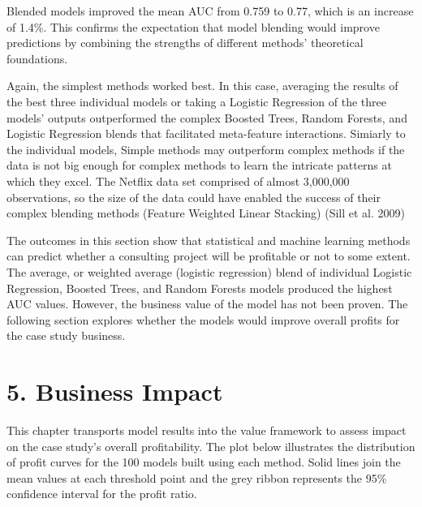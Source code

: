 \documentclass[]{elsarticle} %
\begin{document}
Blended models improved the mean AUC from 0.759 to 0.77, which is an
increase of 1.4\%. This confirms the expectation that model blending
would improve predictions by combining the strengths of different
methods' theoretical foundations.

Again, the simplest methods worked best. In this case, averaging the
results of the best three individual models or taking a Logistic
Regression of the three models' outputs outperformed the complex Boosted
Trees, Random Forests, and Logistic Regression blends that facilitated
meta-feature interactions. Simiarly to the individual models, Simple
methods may outperform complex methods if the data is not big enough for
complex methods to learn the intricate patterns at which they excel. The
Netflix data set comprised of almost 3,000,000 observations, so the size
of the data could have enabled the success of their complex blending
methods (Feature Weighted Linear Stacking) (Sill et al. 2009)

The outcomes in this section show that statistical and machine learning
methods can predict whether a consulting project will be profitable or
not to some extent. The average, or weighted average (logistic
regression) blend of individual Logistic Regression, Boosted Trees, and
Random Forests models produced the highest AUC values. However, the
business value of the model has not been proven. The following section
explores whether the models would improve overall profits for the case
study business.

\section{5. Business Impact}\label{business-impact}

This chapter transports model results into the value framework to assess
impact on the case study's overall profitability. The plot below
illustrates the distribution of profit curves for the 100 models built
using each method. Solid lines join the mean values at each threshold
point and the grey ribbon represents the 95\% confidence interval for
the profit ratio.
\end{document}
